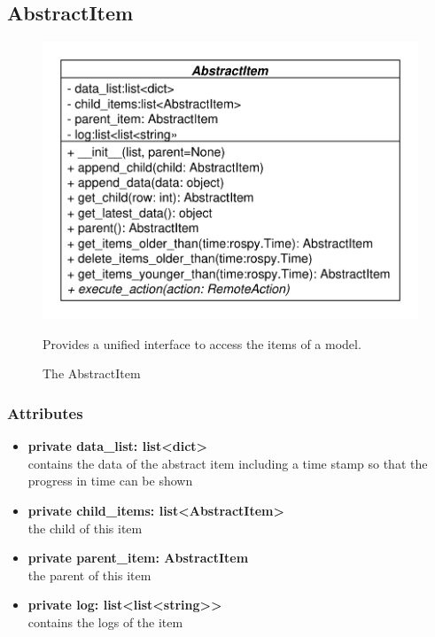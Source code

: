 \subsection{AbstractItem}
\begin{figure}[htbp]
	\begin{minipage}[t]{7cm}
		\vspace{0pt}
		\centering
		\includegraphics[scale=0.6]{./diagram_pictures/AbstractItem.pdf}
		\caption{The AbstractItem}
	\end{minipage}
	\hfill
	\begin{minipage}[t]{6cm}
		\vspace{10pt}		
		Provides a unified interface to access the items of a model.
	\end{minipage}
\end{figure}
\subsubsection{Attributes}
\begin{itemize}
  \item \textbf{private data\_list: list<dict>}\\ 
  contains the data of the abstract item including a time stamp so that
  the progress in time can be shown
  \item \textbf{private child\_items: list<AbstractItem>}\\ 
  the child of this item
  \item \textbf{private parent\_item: AbstractItem}\\ 
  the parent of this item
  \item \textbf{private log: list<list<string>>}\\
  contains the logs of the item
\end{itemize}
